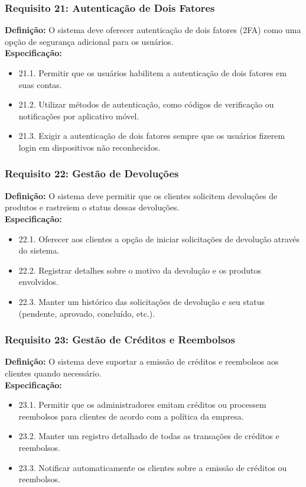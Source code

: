\subsubsection{Requisito 21: Autenticação de Dois Fatores}
\textbf{Definição:} O sistema deve oferecer autenticação de dois fatores (2FA) como uma opção de segurança adicional para os usuários.
\\
\textbf{Especificação:}
\begin{itemize}
	\item 21.1. Permitir que os usuários habilitem a autenticação de dois fatores em suas contas.
	\item 21.2. Utilizar métodos de autenticação, como códigos de verificação ou notificações por aplicativo móvel.
	\item 21.3. Exigir a autenticação de dois fatores sempre que os usuários fizerem login em dispositivos não reconhecidos.
\end{itemize}

\subsubsection{Requisito 22: Gestão de Devoluções}
\textbf{Definição:} O sistema deve permitir que os clientes solicitem devoluções de produtos e rastreiem o status dessas devoluções.
\\
\textbf{Especificação:}
\begin{itemize}
	\item 22.1. Oferecer aos clientes a opção de iniciar solicitações de devolução através do sistema.
	\item 22.2. Registrar detalhes sobre o motivo da devolução e os produtos envolvidos.
	\item 22.3. Manter um histórico das solicitações de devolução e seu status (pendente, aprovado, concluído, etc.).
\end{itemize}

\subsubsection{Requisito 23: Gestão de Créditos e Reembolsos}
\textbf{Definição:} O sistema deve suportar a emissão de créditos e reembolsos aos clientes quando necessário.
\\
\textbf{Especificação:}
\begin{itemize}
	\item 23.1. Permitir que os administradores emitam créditos ou processem reembolsos para clientes de acordo com a política da empresa.
	\item 23.2. Manter um registro detalhado de todas as transações de créditos e reembolsos.
	\item 23.3. Notificar automaticamente os clientes sobre a emissão de créditos ou reembolsos.
\end{itemize}

